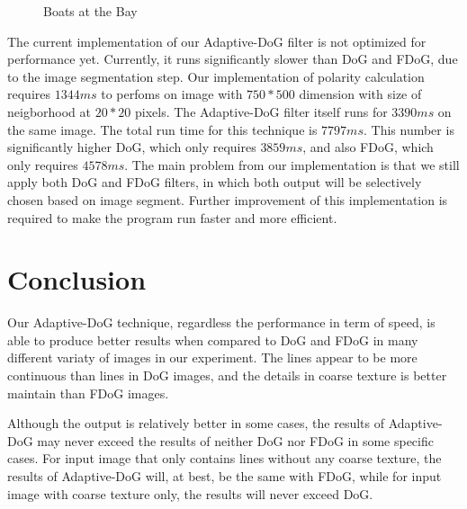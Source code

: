 \begin{figure}[H]
	\centering
	\caption{Boats at the Bay}\label{fig:Compare4}
\end{figure}
The current implementation of our Adaptive-DoG filter is not optimized for performance yet. Currently, it runs significantly slower than DoG and FDoG, due to the image segmentation step. Our implementation of polarity calculation requires $1344 ms$ to perfoms on image with $750*500$ dimension with size of neigborhood at $20*20$ pixels. The Adaptive-DoG filter itself runs for $3390 ms$ on the same image. The total run time for this technique is $7797 ms$. This number is significantly higher DoG, which only requires $3859 ms$, and also FDoG, which only requires $4578 ms$. The main problem from our implementation is that we still apply both DoG and FDoG filters, in which both output will be selectively chosen based on image segment. Further improvement of this implementation is required to make the program run faster and more efficient.

\chapter{Conclusion}
Our Adaptive-DoG technique, regardless the performance in term of speed, is able to produce better results when compared to DoG and FDoG in many different variaty of images in our experiment. The lines appear to be more continuous than lines in DoG images, and the details in coarse texture is better maintain than FDoG images.

Although the output is relatively better in some cases, the results of Adaptive-DoG may never exceed the results of neither DoG nor FDoG in some specific cases. For input image that only contains lines without any coarse texture, the results of Adaptive-DoG will, at best, be the same with FDoG, while for input image with coarse texture only, the results will never exceed DoG.

